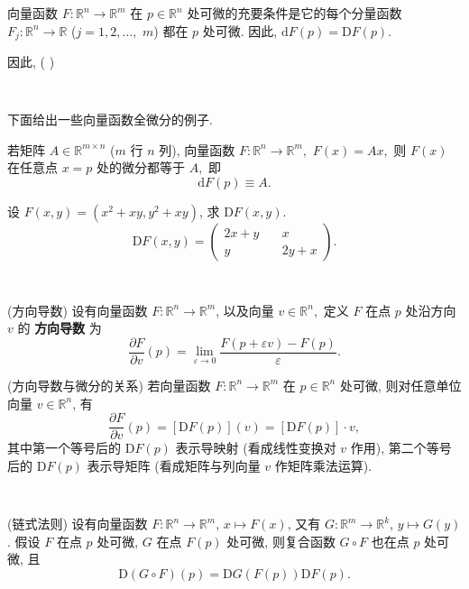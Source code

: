 \begin{theorem}{}
向量函数 $F:\mathbb{R}^{n}\rightarrow\mathbb{R}^{m}$ 在 $p\in\mathbb{R}^{n}$
处可微的充要条件是它的每个分量函数 $F_{j}:\mathbb{R}^{n}\rightarrow\mathbb{R}$ ($j=1,2,\ldots,$ $m$)
都在 $p$ 处可微. 因此, $\mathrm{d}F(p)=\mathrm{D}F(p).$

因此, (  )  
\end{theorem}
\verb| |

下面给出一些向量函数全微分的例子.
\begin{example}{}
若矩阵 $A\in\mathbb{R}^{m\times n}$ ($m$ 行 $n$ 列), 向量函数 $F:\mathbb{R}^{n}\rightarrow\mathbb{R}^{m},$
$F(x)=Ax,$ 则 $F(x)$ 在任意点 $x=p$ 处的微分都等于 $A,$ 即
\[
\mathrm{d}F(p)\equiv A.
\]
\end{example}

\begin{example}{}
设 $F(x,y)=(x^{2}+xy,y^{2}+xy)$, 求 $\mathrm{D}F(x,y).$
$$
\mathrm{D}F(x,y)=\left(\begin{array}{cc}
2x+y\quad & x\\
y & 2y+x
\end{array}\right).
$$
\end{example}
\verb| |



\begin{definition}{(方向导数)}
设有向量函数 $F:\mathbb{R}^{n}\rightarrow\mathbb{R}^{m}$, 以及向量 $v\in\mathbb{R}^{n},$
定义 $F$ 在点 $p$ 处沿方向 $v$ 的 \textbf{方向导数} 为 
\[
{\displaystyle \frac{\partial F}{\partial v}(p)={\displaystyle \lim_{\varepsilon\rightarrow0}{\displaystyle \frac{F(p+\varepsilon v)-F(p)}{\varepsilon}}.}}
\]
\end{definition}

\begin{theorem}{(方向导数与微分的关系)}
若向量函数 $F:\mathbb{R}^{n}\rightarrow\mathbb{R}^{m}$ 在 $p\in\mathbb{R}^{n}$
处可微, 则对任意单位向量 $v\in\mathbb{R}^{n}$, 有
\[
\frac{\partial F}{\partial v}(p)=[\mathrm{D}F(p)](v)=[\mathrm{D}F(p)]\cdot v,
\]
其中第一个等号后的 $\mathrm{D}F(p)$ 表示导映射 (看成线性变换对 $v$ 作用), 第二个等号后的 $\mathrm{D}F(p)$
表示导矩阵 (看成矩阵与列向量 $v$ 作矩阵乘法运算).
\end{theorem}
\verb| |

\begin{theorem}{(链式法则)}
设有向量函数 $F:\mathbb{R}^{n}\rightarrow\mathbb{R}^{m}$, $x\mapsto F(x)$,
又有 $G:\mathbb{R}^{m}\rightarrow\mathbb{R}^{k}$, $y\mapsto G(y)$.
假设 $F$ 在点 $p$ 处可微, $G$ 在点 $F(p)$ 处可微, 则复合函数 $G\circ F$ 也在点 $p$
处可微, 且
\[
\mathrm{D}(G\circ F)(p)=\mathrm{D}G(F(p))\mathrm{D}F(p).
\]
\end{theorem}

